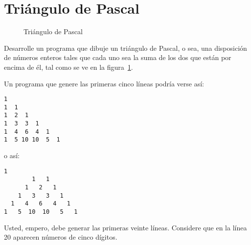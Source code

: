 \section{Triángulo de Pascal}

\begin{figure}
  \centering
  
  \label{fig:triangulo-pascal}
  \caption{Triángulo de Pascal}
\end{figure}

Desarrolle un programa que dibuje un
triángulo de Pascal, o sea, una disposición de números enteros tales que cada uno
sea la suma de los dos que están por encima de él,
tal como se ve en la figura~\ref{fig:triangulo-pascal}.

Un programa que genere las primeras cinco líneas
podría verse así:
\begin{lstlisting}[language=testcase]
1
1  1
1  2  1
1  3  3  1
1  4  6  4  1
1  5 10 10  5  1
\end{lstlisting}
o así:
\begin{lstlisting}[language=testcase]
          1
        1   1
      1   2   1
    1   3   3   1
  1   4   6   4   1
1   5  10  10   5   1
\end{lstlisting}
Usted, empero, debe generar las primeras veinte líneas.
Considere que en la línea 20 aparecen números de cinco dígitos.

